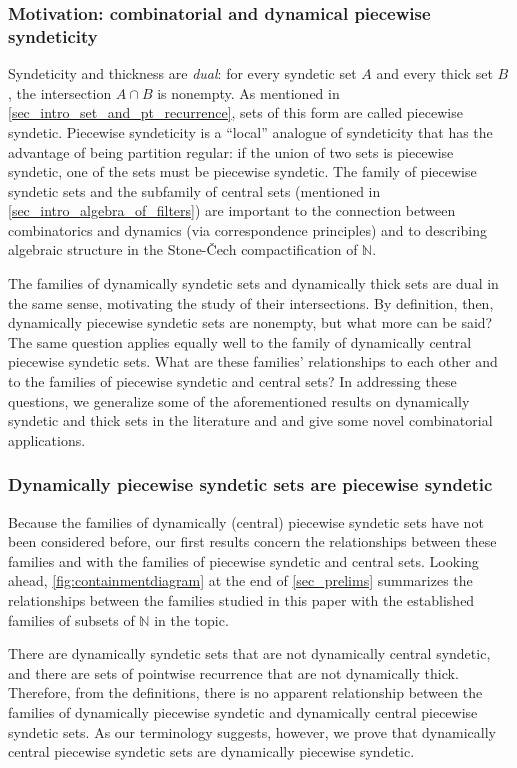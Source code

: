 \documentclass[letter,11pt]{article}
\theoremstyle{plain}
\theoremstyle{definition}
\theoremstyle{plain}
\theoremstyle{plain}
\numberwithin{equation}{section}
\newcommand{\Cech}{\v{C}ech}
\newcommand{\N}{\mathbb{N}}
\begin{document}
\subsubsection{Motivation: combinatorial and dynamical piecewise syndeticity}

Syndeticity and thickness are \emph{dual}: for every syndetic set $A$ and every thick set $B$, the intersection $A \cap B$ is nonempty.  As mentioned in \cref{sec_intro_set_and_pt_recurrence}, sets of this form are called piecewise syndetic.  Piecewise syndeticity is a ``local'' analogue of syndeticity that has the advantage of being partition regular: if the union of two sets is piecewise syndetic, one of the sets must be piecewise syndetic.  The family of piecewise syndetic sets and the subfamily of central sets (mentioned in \cref{sec_intro_algebra_of_filters}) are important to the connection between combinatorics and dynamics (via correspondence principles) and to describing algebraic structure in the Stone-\Cech{} compactification of $\N$.

The families of dynamically syndetic sets and dynamically thick sets are dual in the same sense, motivating the study of their intersections.  By definition, then, dynamically piecewise syndetic sets are nonempty, but what more can be said?  The same question applies equally well to the family of dynamically central piecewise syndetic sets.  What are these families' relationships to each other and to the families of piecewise syndetic and central sets?  In addressing these questions, we generalize some of the aforementioned results on dynamically syndetic and thick sets in the literature and and give some novel combinatorial applications.



\subsubsection{Dynamically piecewise syndetic sets are piecewise syndetic}

Because the families of dynamically (central) piecewise syndetic sets have not been considered before, our first results concern the relationships between these families and with the families of piecewise syndetic and central sets. Looking ahead, \cref{fig:containmentdiagram} at the end of \cref{sec_prelims} summarizes the relationships between the families studied in this paper with the established families of subsets of $\N$ in the topic.

There are dynamically syndetic sets that are not dynamically central syndetic, and there are sets of pointwise recurrence that are not dynamically thick.  Therefore, from the definitions, there is no apparent relationship between the families of dynamically piecewise syndetic and dynamically central piecewise syndetic sets.  As our terminology suggests, however, we prove that dynamically central piecewise syndetic sets are dynamically piecewise syndetic.
\end{document}
